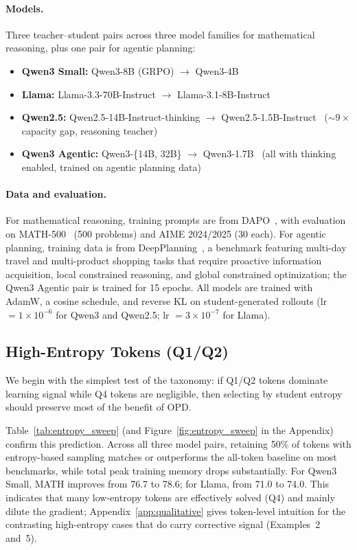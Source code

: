 \documentclass{article}
\begin{document}
\paragraph{Models.}
Three teacher--student pairs across three model families for mathematical reasoning, plus one pair for agentic planning:
\begin{itemize}
    \item \textbf{Qwen3 Small:} Qwen3-8B (GRPO) $\to$ Qwen3-4B~\citep{qwen2025qwen3}
    \item \textbf{Llama:} Llama-3.3-70B-Instruct $\to$ Llama-3.1-8B-Instruct~\citep{grattafiori2024llama3}
    \item \textbf{Qwen2.5:} Qwen2.5-14B-Instruct-thinking $\to$ Qwen2.5-1.5B-Instruct~\citep{qwen2025qwen25} ($ {\sim}9\times$ capacity gap, reasoning teacher)
    \item \textbf{Qwen3 Agentic:} Qwen3-\{14B, 32B\} $\to$ Qwen3-1.7B~\citep{qwen2025qwen3} (all with thinking enabled, trained on agentic planning data)
\end{itemize}

\paragraph{Data and evaluation.}
For mathematical reasoning, training prompts are from DAPO~\citep{yu2025dapo}, with evaluation on MATH-500~\citep{hendrycks2021math} (500 problems) and AIME 2024/2025 (30 each).
For agentic planning, training data is from DeepPlanning~\citep{zhang2026deepplanning}, a benchmark featuring multi-day travel and multi-product shopping tasks that require proactive information acquisition, local constrained reasoning, and global constrained optimization; the Qwen3 Agentic pair is trained for 15 epochs.
All models are trained with AdamW, a cosine schedule, and reverse KL on student-generated rollouts (lr $= 1 \times 10^{-6}$ for Qwen3 and Qwen2.5; lr $= 3 \times 10^{-7}$ for Llama).

\subsection{High-Entropy Tokens (Q1/Q2)}
\label{sec:entropy_matters}

We begin with the simplest test of the taxonomy: if Q1/Q2 tokens dominate learning signal while Q4 tokens are negligible, then selecting by student entropy should preserve most of the benefit of OPD.

Table~\ref{tab:entropy_sweep} (and Figure~\ref{fig:entropy_sweep} in the Appendix) confirm this prediction.
Across all three model pairs, retaining 50\% of tokens with entropy-based sampling matches or outperforms the all-token baseline on most benchmarks, while total peak training memory drops substantially.
For Qwen3 Small, MATH improves from 76.7 to 78.6; for Llama, from 71.0 to 74.0.
This indicates that many low-entropy tokens are effectively solved (Q4) and mainly dilute the gradient; Appendix~\ref{app:qualitative} gives token-level intuition for the contrasting high-entropy cases that do carry corrective signal (Examples~2 and~5).
\end{document}
